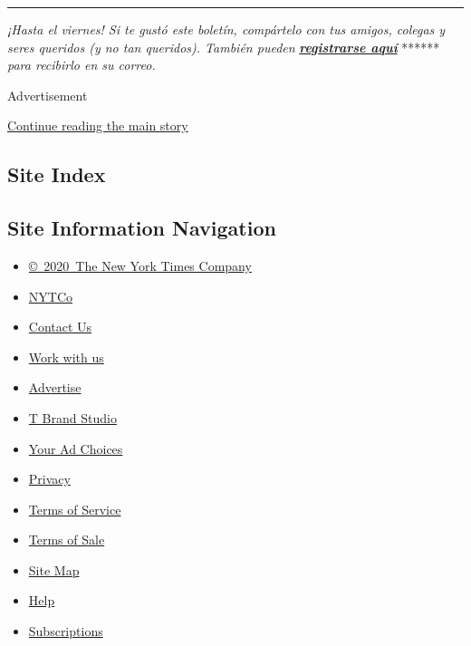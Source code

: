 \begin{center}\rule{0.5\linewidth}{\linethickness}\end{center}

\emph{¡Hasta el viernes! Si te gustó este boletín, compártelo con tus
amigos, colegas y seres queridos (y no tan queridos). También pueden}
\textbf{\href{https://www.nytimes3xbfgragh.onion/newsletters/el-times}{\emph{registrarse
aquí}}} ****** \emph{para recibirlo en su correo.}

Advertisement

\protect\hyperlink{after-bottom}{Continue reading the main story}

\hypertarget{site-index}{%
\subsection{Site Index}\label{site-index}}

\hypertarget{site-information-navigation}{%
\subsection{Site Information
Navigation}\label{site-information-navigation}}

\begin{itemize}
\tightlist
\item
  \href{https://help.nytimes3xbfgragh.onion/hc/en-us/articles/115014792127-Copyright-notice}{©~2020~The
  New York Times Company}
\end{itemize}

\begin{itemize}
\tightlist
\item
  \href{https://www.nytco.com/}{NYTCo}
\item
  \href{https://help.nytimes3xbfgragh.onion/hc/en-us/articles/115015385887-Contact-Us}{Contact
  Us}
\item
  \href{https://www.nytco.com/careers/}{Work with us}
\item
  \href{https://nytmediakit.com/}{Advertise}
\item
  \href{http://www.tbrandstudio.com/}{T Brand Studio}
\item
  \href{https://www.nytimes3xbfgragh.onion/privacy/cookie-policy\#how-do-i-manage-trackers}{Your
  Ad Choices}
\item
  \href{https://www.nytimes3xbfgragh.onion/privacy}{Privacy}
\item
  \href{https://help.nytimes3xbfgragh.onion/hc/en-us/articles/115014893428-Terms-of-service}{Terms
  of Service}
\item
  \href{https://help.nytimes3xbfgragh.onion/hc/en-us/articles/115014893968-Terms-of-sale}{Terms
  of Sale}
\item
  \href{https://spiderbites.nytimes3xbfgragh.onion}{Site Map}
\item
  \href{https://help.nytimes3xbfgragh.onion/hc/en-us}{Help}
\item
  \href{https://www.nytimes3xbfgragh.onion/subscription?campaignId=37WXW}{Subscriptions}
\end{itemize}
